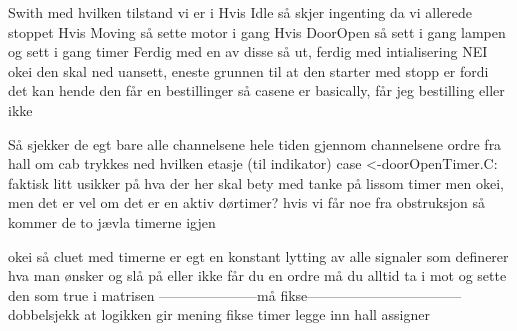 Swith med hvilken tilstand vi er i
    Hvis Idle så skjer ingenting da vi allerede stoppet
    Hvis Moving så sette motor i gang
    Hvis DoorOpen så sett i gang lampen og sett i gang timer
Ferdig med en av disse så ut, ferdig med intialisering
NEI okei den skal ned uansett, eneste grunnen til at den starter med stopp er fordi det kan hende den får en bestillinger
    så casene er basically, får jeg bestilling eller ikke

Så sjekker de egt bare alle channelsene hele tiden gjennom channelsene
    ordre fra hall
    om cab trykkes ned
    hvilken etasje (til indikator)
    case <-doorOpenTimer.C: faktisk litt usikker på hva der her skal bety med tanke på lissom timer men okei, men det er vel om det er en aktiv dørtimer?
    hvis vi får noe fra obstruksjon
    så kommer de to jævla timerne igjen


okei så cluet med timerne er egt en konstant lytting av alle signaler
som definerer hva man ønsker og slå på eller ikke
får du en ordre må du alltid ta i mot og sette den som true i matrisen
---------------------må fikse---------------------------------
dobbelsjekk at logikken gir mening
fikse timer
legge inn hall assigner